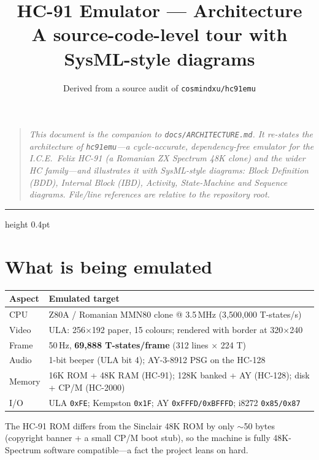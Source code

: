 \documentclass[11pt,a4paper]{article}
\title{\textbf{HC-91 Emulator — Architecture}\\[2pt]
       \large A source-code-level tour with SysML-style diagrams}
\author{Derived from a source audit of \texttt{cosmindxu/hc91emu}}
\date{}
\begin{document}
\sloppy
\maketitle
\thispagestyle{empty}

\begin{quote}\small\itshape
This document is the companion to \texttt{docs/ARCHITECTURE.md}. It re-states
the architecture of \texttt{hc91emu}---a cycle-accurate, dependency-free
emulator for the I.C.E.\ Felix HC-91 (a Romanian ZX Spectrum 48K clone) and the
wider HC family---and illustrates it with SysML-style diagrams: Block
Definition (BDD), Internal Block (IBD), Activity, State-Machine and Sequence
diagrams. File/line references are relative to the repository root.
\end{quote}

\tableofcontents
\vspace{4pt}\hrule height 0.4pt

\section{What is being emulated}

\begin{center}
\begin{tabular}{@{}p{1.8cm}p{13.4cm}@{}}
\toprule
\textbf{Aspect} & \textbf{Emulated target} \\
\midrule
CPU    & Z80A / Romanian MMN80 clone @ 3.5\,MHz (3{,}500{,}000 T-states/s) \\
Video  & ULA: 256$\times$192 paper, 15 colours; rendered with border at 320$\times$240 \\
Frame  & 50\,Hz, \textbf{69{,}888 T-states/frame} (312 lines $\times$ 224 T) \\
Audio  & 1-bit beeper (ULA bit 4); AY-3-8912 PSG on the HC-128 \\
Memory & 16K ROM + 48K RAM (HC-91); 128K banked + AY (HC-128); disk + CP/M (HC-2000) \\
I/O    & ULA \texttt{0xFE}; Kempston \texttt{0x1F}; AY \texttt{0xFFFD/0xBFFFD}; i8272 \texttt{0x85/0x87} \\
\bottomrule
\end{tabular}
\end{center}

The HC-91 ROM differs from the Sinclair 48K ROM by only $\sim$50 bytes
(copyright banner + a small CP/M boot stub), so the machine is fully
48K-Spectrum software compatible---a fact the project leans on hard.
\end{document}
